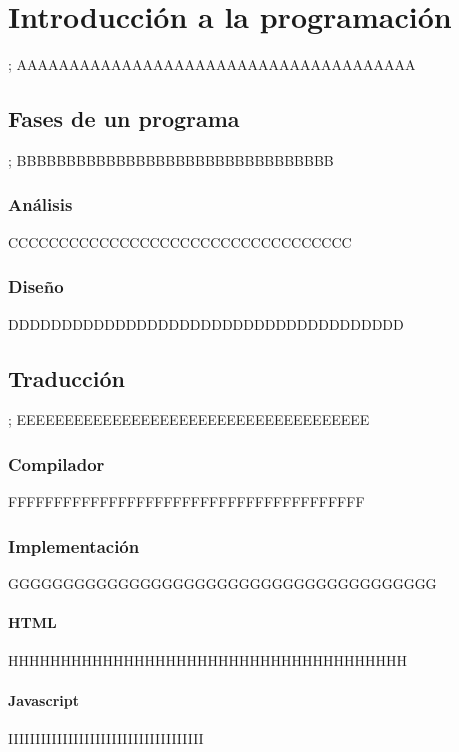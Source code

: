 \chapter{Introducción a la programación};
AAAAAAAAAAAAAAAAAAAAAAAAAAAAAAAAAAAAAA
	\section{Fases de un programa};
	BBBBBBBBBBBBBBBBBBBBBBBBBBBBBBBB
		\subsection{Análisis}
		CCCCCCCCCCCCCCCCCCCCCCCCCCCCCCCCCC
		\subsection{Diseño}
		DDDDDDDDDDDDDDDDDDDDDDDDDDDDDDDDDDDDD
	\section{Traducción};
	EEEEEEEEEEEEEEEEEEEEEEEEEEEEEEEEEEEEE
		\subsection{Compilador}
		FFFFFFFFFFFFFFFFFFFFFFFFFFFFFFFFFFFFFFF
		\subsection{Implementación}
		GGGGGGGGGGGGGGGGGGGGGGGGGGGGGGGGGGGGGGG
			\subsubsection{HTML}
			HHHHHHHHHHHHHHHHHHHHHHHHHHHHHHHHHHHHHH
			\subsubsection{Javascript}
			IIIIIIIIIIIIIIIIIIIIIIIIIIIIIIIIIIII
